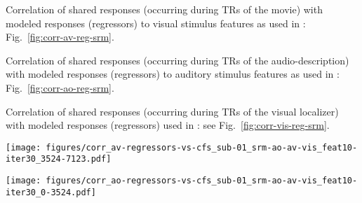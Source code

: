 %
Correlation of shared responses (occurring during TRs of the movie) with modeled
responses (regressors) to visual stimulus features as used in
\citet{haeusler2022processing}: Fig.~\ref{fig:corr-av-reg-srm}.

%
Correlation of shared responses (occurring during TRs of the audio-description)
with modeled responses (regressors) to auditory stimulus features as used in
\citet{haeusler2022processing}: Fig.~\ref{fig:corr-ao-reg-srm}.

%
Correlation of shared responses (occurring during TRs of the visual localizer)
with modeled responses (regressors) used in \citet{sengupta2016extension}: see
Fig.~\ref{fig:corr-vis-reg-srm}.



\begin{figure*}[tbp]
\centering
    \texttt{[image: figures/corr\_av-regressors-vs-cfs\_sub-01\_srm-ao-av-vis\_feat10-iter30\_3524-7123.pdf]}
    \caption{
    \textbf{Correlations of shared responses and regressors of the movie.}
    Pearson correlation coefficients between a) shared responses (sh. res.)
    within the \ac{cfs} that was calculated for subject 01 and b) regressors
    created in \citet{haeusler2022processing} to model hemodynamic responses to
    stimulus features of the movie.
    The time series of the \ac{cfs} were sliced to match the TRs of the
    movie.
    }
    \label{fig:corr-av-reg-srm}
\end{figure*}



\begin{figure*}[tbp]
\centering
    \texttt{[image: figures/corr\_ao-regressors-vs-cfs\_sub-01\_srm-ao-av-vis\_feat10-iter30\_0-3524.pdf]}
    \caption{
    \textbf{Correlations of shared responses and regressors of the audio-description.}
    Pearson correlation coefficients between a) shared responses (sh. res.)
    within the \ac{cfs} that was calculated for subject 01 and b) regressors
    created in \citet{haeusler2022processing} to model hemodynamic responses to
    stimulus features of the audio-description.
    \texttt{geo\&groom} is a combination of
    regressors as used on the positive side of the primary contrasts aimed to
    localize the \ac{ppa} (cf. Table 5 in \citet{haeusler2022processing}.
    The time series of the \ac{cfs} were sliced to match the TRs of the
    audio-description.
    }
    \label{fig:corr-ao-reg-srm}
\end{figure*}



